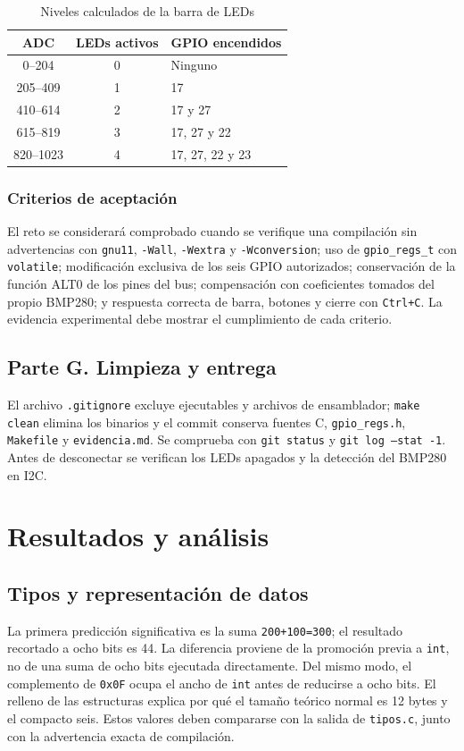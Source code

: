 \documentclass[conference]{IEEEtran}
\begin{document}
\begin{table}[!htbp]\centering\caption{Niveles calculados de la barra de LEDs}\scriptsize
\begin{tabular}{|c|c|p{3.1cm}|}\hline
ADC & LEDs activos & GPIO encendidos \\ \hline
0--204 & 0 & Ninguno \\ \hline
205--409 & 1 & 17 \\ \hline
410--614 & 2 & 17 y 27 \\ \hline
615--819 & 3 & 17, 27 y 22 \\ \hline
820--1023 & 4 & 17, 27, 22 y 23 \\ \hline
\end{tabular}\end{table}

\subsubsection{Criterios de aceptación}
El reto se considerará comprobado cuando se verifique una compilación sin advertencias con \texttt{gnu11}, \texttt{-Wall}, \texttt{-Wextra} y \texttt{-Wconversion}; uso de \texttt{gpio\_regs\_t} con \texttt{volatile}; modificación exclusiva de los seis GPIO autorizados; conservación de la función ALT0 de los pines del bus; compensación con coeficientes tomados del propio BMP280; y respuesta correcta de barra, botones y cierre con \texttt{Ctrl+C}. La evidencia experimental debe mostrar el cumplimiento de cada criterio.
\subsection{Parte G. Limpieza y entrega}
El archivo \texttt{.gitignore} excluye ejecutables y archivos de ensamblador; \texttt{make clean} elimina los binarios y el commit conserva fuentes C, \texttt{gpio\_regs.h}, \texttt{Makefile} y \texttt{evidencia.md}. Se comprueba con \texttt{git status} y \texttt{git log --stat -1}. Antes de desconectar se verifican los LEDs apagados y la detección del BMP280 en I2C.
\section{Resultados y análisis}
\subsection{Tipos y representación de datos}
La primera predicción significativa es la suma \texttt{200+100=300}; el resultado recortado a ocho bits es 44. La diferencia proviene de la promoción previa a \texttt{int}, no de una suma de ocho bits ejecutada directamente. Del mismo modo, el complemento de \texttt{0x0F} ocupa el ancho de \texttt{int} antes de reducirse a ocho bits. El relleno de las estructuras explica por qué el tamaño teórico normal es 12 bytes y el compacto seis. Estos valores deben compararse con la salida de \texttt{tipos.c}, junto con la advertencia exacta de compilación.
\end{document}
